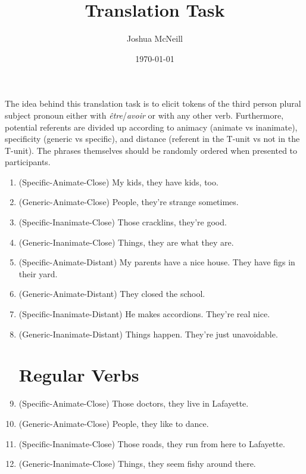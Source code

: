 \documentclass{article}
\title{Translation Task}
\author{Joshua McNeill}
\date{\today}
\begin{document}
    \maketitle
    The idea behind this translation task is to elicit tokens of the third person plural subject pronoun either with \emph{être}/\emph{avoir} or with any other verb. Furthermore, potential referents are divided up according to animacy (animate vs inanimate), specificity (generic vs specific), and distance (referent in the T-unit vs not in the T-unit). The phrases themselves should be randomly ordered when presented to participants.

    \begin{enumerate}
        \section{\emph{être}/\emph{avoir}}
            \item (Specific-Animate-Close) My kids, they have kids, too.
            \item (Generic-Animate-Close) People, they're strange sometimes.

            \item (Specific-Inanimate-Close) Those cracklins, they're good.
            \item (Generic-Inanimate-Close) Things, they are what they are.

            \item (Specific-Animate-Distant) My parents have a nice house. They have figs in their yard.
            \item (Generic-Animate-Distant) They closed the school.

            \item (Specific-Inanimate-Distant) He makes accordions. They're real nice.
            \item (Generic-Inanimate-Distant) Things happen. They're just unavoidable.
        \section{Regular Verbs}
            \item (Specific-Animate-Close) Those doctors, they live in Lafayette.
            \item (Generic-Animate-Close) People, they like to dance.

            \item (Specific-Inanimate-Close) Those roads, they run from here to Lafayette.
            \item (Generic-Inanimate-Close) Things, they seem fishy around there.


\end{enumerate}
\end{document}
